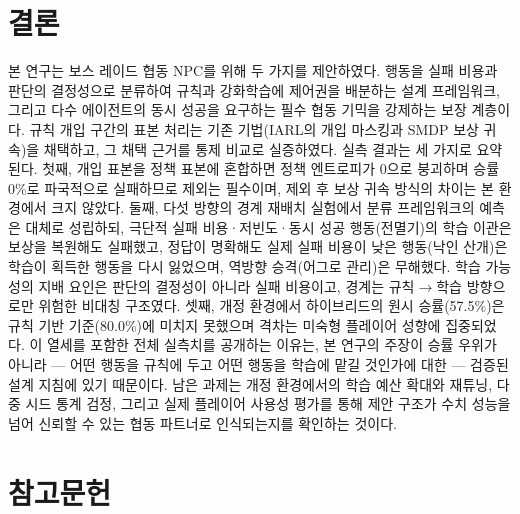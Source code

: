 \documentclass[12pt]{article}      %
\begin{document}
\section{결론}

본 연구는 보스 레이드 협동 NPC를 위해 두 가지를 제안하였다. 행동을 실패 비용과
판단의 결정성으로 분류하여 규칙과 강화학습에 제어권을 배분하는 설계
프레임워크, 그리고 다수 에이전트의 동시 성공을 요구하는 필수 협동 기믹을
강제하는 보장 계층이다. 규칙 개입 구간의 표본 처리는 기존 기법(IARL의 개입
마스킹과 SMDP 보상 귀속)을 채택하고, 그 채택 근거를 통제 비교로 실증하였다.
실측 결과는 세 가지로 요약된다. 첫째, 개입 표본을 정책 표본에 혼합하면 정책
엔트로피가 0으로 붕괴하며 승률 0\%로 파국적으로 실패하므로 제외는 필수이며,
제외 후 보상 귀속 방식의 차이는 본 환경에서 크지 않았다. 둘째, 다섯 방향의 경계
재배치 실험에서 분류 프레임워크의 예측은 대체로 성립하되, 극단적 실패
비용·저빈도·동시 성공 행동(전멸기)의 학습 이관은 보상을 복원해도 실패했고,
정답이 명확해도 실제 실패 비용이 낮은 행동(낙인 산개)은 학습이 획득한 행동을
다시 잃었으며, 역방향 승격(어그로 관리)은 무해했다. 학습 가능성의 지배 요인은
판단의 결정성이 아니라 실패 비용이고, 경계는 규칙$\rightarrow$학습 방향으로만
위험한 비대칭 구조였다. 셋째, 개정 환경에서 하이브리드의 원시 승률(57.5\%)은
규칙 기반 기준(80.0\%)에 미치지 못했으며 격차는 미숙형 플레이어 성향에
집중되었다. 이 열세를 포함한 전체 실측치를 공개하는 이유는, 본 연구의 주장이
승률 우위가 아니라 --- 어떤 행동을 규칙에 두고 어떤 행동을 학습에 맡길 것인가에
대한 --- 검증된 설계 지침에 있기 때문이다. 남은 과제는 개정 환경에서의 학습 예산
확대와 재튜닝, 다중 시드 통계 검정, 그리고 실제 플레이어 사용성 평가를 통해
제안 구조가 수치 성능을 넘어 신뢰할 수 있는 협동 파트너로 인식되는지를 확인하는
것이다.

\clearpage

\section*{참고문헌}
\end{document}
